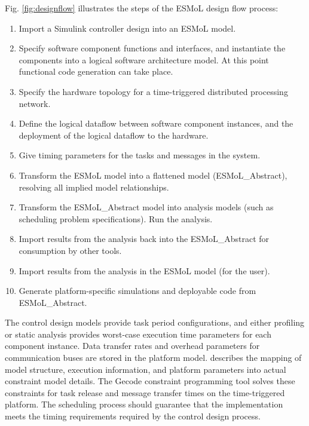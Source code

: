 Fig. \ref{fig:designflow} illustrates the steps of the ESMoL design flow process\cite{jp_esmol}:

\begin{enumerate}
\item Import a Simulink controller design into an ESMoL model.
\item Specify software component functions and interfaces, and instantiate the components into a logical software architecture model.  At this point functional code generation can take place.
\item Specify the hardware topology for a time-triggered distributed processing network.
\item Define the logical dataflow between software component instances, and the deployment of the logical dataflow to the hardware.
\item Give timing parameters for the tasks and messages in the system.
\item Transform the ESMoL model into a flattened model (ESMoL\_Abstract), resolving all implied model relationships.
\item Transform the ESMoL\_Abstract model into analysis models (such as scheduling problem specifications). Run the analysis.
\item Import results from the analysis back into the ESMoL\_Abstract for consumption by other tools.
\item Import results from the analysis in the ESMoL model (for the user).
\item Generate platform-specific simulations and deployable code from ESMoL\_Abstract.
\end{enumerate}

The control design models provide task period configurations, and 
either profiling or static analysis provides worst-case 
execution time parameters for each component instance.  
Data transfer rates and overhead parameters for communication
buses are stored in the platform model. \cite{jp_tt_sched}
describes the mapping of model structure, execution information,
and platform parameters into actual constraint model details. The Gecode constraint programming
tool solves these constraints for task release and
message transfer times on the time-triggered platform. The scheduling process
should guarantee that the implementation meets the timing requirements 
required by the control design process.

